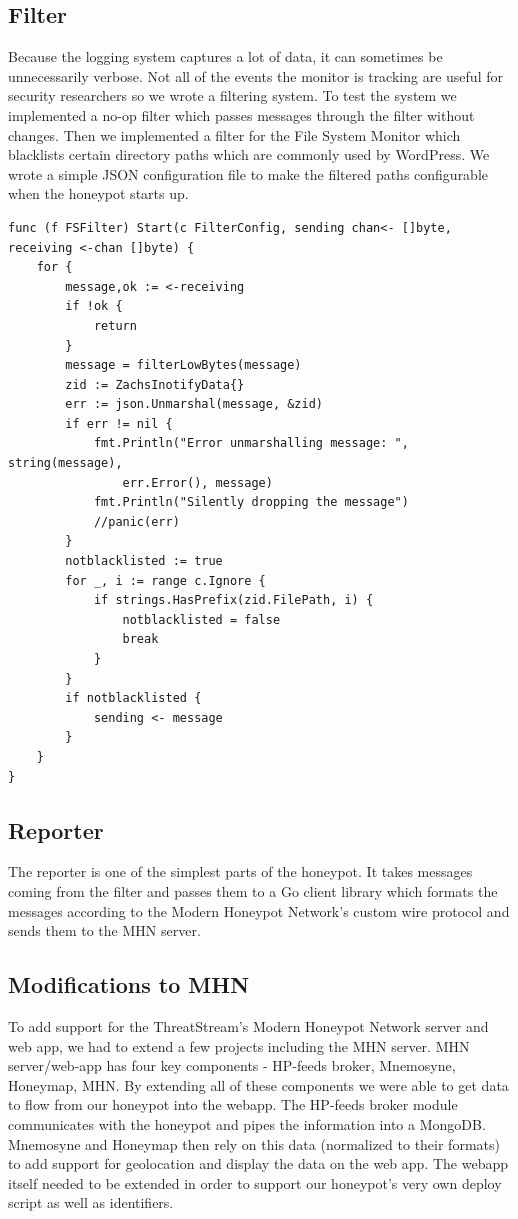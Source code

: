 \documentclass[10pt,conference,draftclsnofoot,onecolumn]{IEEEtran}
\begin{document}
\subsection{Filter}
Because the logging system captures a lot of data, it can sometimes be unnecessarily verbose. Not all of the events the monitor is tracking are useful for security researchers so we wrote a filtering system. To test the system we implemented a no-op filter which passes messages through the filter without changes. Then we implemented a filter for the File System Monitor which blacklists certain directory paths which are commonly used by WordPress. We wrote a simple JSON configuration file to make the filtered paths configurable when the honeypot starts up.

\begin{lstlisting}
func (f FSFilter) Start(c FilterConfig, sending chan<- []byte, receiving <-chan []byte) {
	for {
		message,ok := <-receiving
		if !ok {
			return
		}
		message = filterLowBytes(message)
		zid := ZachsInotifyData{}
		err := json.Unmarshal(message, &zid)
		if err != nil {
			fmt.Println("Error unmarshalling message: ", string(message),
				err.Error(), message)
			fmt.Println("Silently dropping the message")
			//panic(err)
		}
		notblacklisted := true
		for _, i := range c.Ignore {
			if strings.HasPrefix(zid.FilePath, i) {
				notblacklisted = false
				break
			}
		}
		if notblacklisted {
			sending <- message
		}
	}
}
\end{lstlisting}

\subsection{Reporter}
The reporter is one of the simplest parts of the honeypot. It takes messages coming from the filter and passes them to a Go client library which formats the messages according to the Modern Honeypot Network's custom wire protocol and sends them to the MHN server.

\subsection{Modifications to MHN}
To add support for the ThreatStream’s Modern Honeypot Network server and web app, we had to extend a few projects including the MHN server. MHN server/web-app has four key components - HP-feeds broker, Mnemosyne, Honeymap, MHN.  By extending all of these components we were able to get data to flow from our honeypot into the webapp. The HP-feeds broker module communicates with the honeypot and pipes the information into a MongoDB. Mnemosyne and Honeymap then rely on this data (normalized to their formats) to add support for geolocation and display the data on the web app. The webapp itself needed to be extended in order to support our honeypot’s very own deploy script as well as identifiers. 
\end{document}

